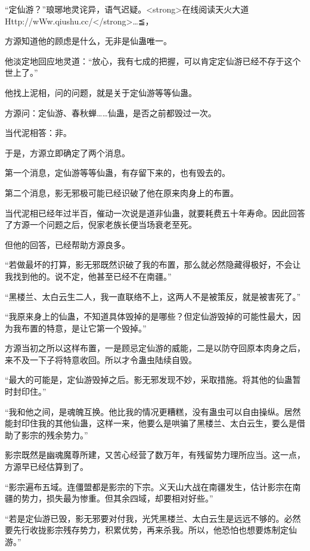 
\begin{this_body}

“定仙游？”琅琊地灵诧异，语气迟疑。<strong>在线阅读天火大道Http://wWw.qiushu.cc/</strong>…≦，

方源知道他的顾虑是什么，无非是仙蛊唯一。

他淡定地回应地灵道：“放心，我有七成的把握，可以肯定定仙游已经不存于这个世上了。”

他找上泥相，问的问题，就是关于定仙游等等仙蛊。

方源问：定仙游、春秋蝉……仙蛊，是否之前都毁过一次。

当代泥相答：非。

于是，方源立即确定了两个消息。

第一个消息，定仙游等等仙蛊，有存留下来的，也有毁去的。

第二个消息，影无邪极可能已经识破了他在原来肉身上的布置。

当代泥相已经年过半百，催动一次说是道非仙蛊，就要耗费五十年寿命。因此回答了方源一个问题之后，倪家老族长便当场衰老至死。

但他的回答，已经帮助方源良多。

“若做最坏的打算，影无邪既然识破了我的布置，那么就必然隐藏得极好，不会让我找到他的。说不定，他甚至已经不在南疆。”

“黑楼兰、太白云生二人，我一直联络不上，这两人不是被策反，就是被害死了。”

“我原来身上的仙蛊，不知道具体毁掉的是哪些？但定仙游毁掉的可能性最大，因为我布置的特意，是让它第一个毁掉。”

方源当初之所以这样布置，一是顾忌定仙游的威能，二是以防夺回原本肉身之后，来不及一下子将特意收回。所以才令蛊虫陆续自毁。

“最大的可能是，定仙游毁掉之后。影无邪发现不妙，采取措施。将其他的仙蛊暂时封印住。”

“我和他之间，是魂魄互换。他比我的情况更糟糕，没有蛊虫可以自由操纵。居然能封印住我的其他仙蛊，这样一来，他要么是哄骗了黑楼兰、太白云生，要么是借助了影宗的残余势力。”

影宗既然是幽魂魔尊所建，又苦心经营了数万年，有残留势力理所应当。这一点，方源早已经估算到了。

“影宗遍布五域。连僵盟都是影宗的下宗。义天山大战在南疆发生，估计影宗在南疆的势力，损失最为惨重。但其余四域，却要相对好些。”

“若是定仙游已毁，影无邪要对付我，光凭黑楼兰、太白云生是远远不够的。必然要先行收拢影宗残存势力，积累优势，再来杀我。所以，他恐怕也想要炼制定仙游。”


\end{this_body}
